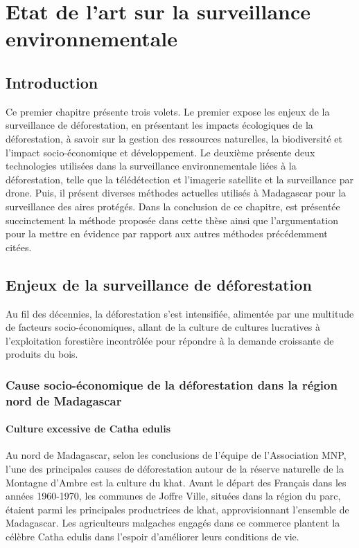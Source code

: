 \chapter{Etat de l'art sur la surveillance environnementale}
\section{Introduction}
Ce premier chapitre présente trois volets. Le premier expose les enjeux de la surveillance de déforestation, en présentant les impacts écologiques de la déforestation, à savoir sur la gestion des ressources naturelles, la biodiversité et l’impact socio-économique et développement. Le deuxième présente deux technologies utilisées dans la surveillance environnementale liées à la déforestation, telle que la télédétection et l’imagerie satellite et la surveillance par drone. Puis, il présent diverses méthodes actuelles utilisés à Madagascar pour la surveillance des aires protégés. Dans la conclusion de ce chapitre, est présentée succinctement la méthode proposée dans cette thèse ainsi que l’argumentation pour la mettre en évidence par rapport aux autres méthodes précédemment citées.

\section{Enjeux de la surveillance de déforestation }
Au fil des décennies, la déforestation s'est intensifiée, alimentée par une multitude de facteurs socio-économiques, allant de la culture de cultures lucratives à l'exploitation forestière incontrôlée pour répondre à la demande croissante de produits du bois.
\\

\subsection{Cause socio-économique de la déforestation dans la région nord de Madagascar}
\subsubsection{Culture excessive de Catha edulis}
Au nord de Madagascar, selon les conclusions de l'équipe de l'Association MNP, l'une des principales causes de déforestation autour de la réserve naturelle de la Montagne d'Ambre est la culture du khat. Avant le départ des Français dans les années 1960-1970, les communes de Joffre Ville, situées dans la région du parc, étaient parmi les principales productrices de khat, approvisionnant l'ensemble de Madagascar. Les agriculteurs malgaches engagés dans ce commerce plantent la célèbre Catha edulis dans l'espoir d'améliorer leurs conditions de vie. 
\\

